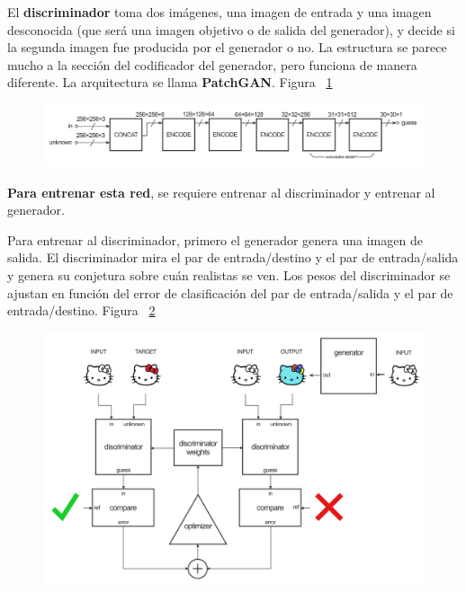 \documentclass[10pt,journal,compsoc]{IEEEtran}\usepackage[T1]{fontenc}                              %
\begin{document}
El \textbf{discriminador} toma dos imágenes, una imagen de entrada y una
imagen desconocida (que será una imagen objetivo o de salida del
generador), y decide si la segunda imagen fue producida por el generador
o no. La estructura se parece mucho a la sección del codificador del
generador, pero funciona de manera diferente. La arquitectura se llama
\textbf{PatchGAN}. Figura ~\ref{fig:7}

\begin{figure}[!htb]
  \begin{center}
    \includegraphics[width=\linewidth]{./imgs/08_pix2pix_example.png}
    \caption{}
    \label{fig:7}
  \end{center}
\end{figure}

\textbf{Para entrenar esta red}, se requiere entrenar al discriminador y
entrenar al generador.

Para entrenar al discriminador, primero el generador genera una imagen
de salida. El discriminador mira el par de entrada/destino y el par de
entrada/salida y genera su conjetura sobre cuán realistas se ven. Los
pesos del discriminador se ajustan en función del error de clasificación
del par de entrada/salida y el par de entrada/destino. Figura ~\ref{fig:8}

\begin{figure}[!htb]
  \begin{center}
    \includegraphics[width=\linewidth]{./imgs/09_pix2pix_example.png}
    \caption{}
    \label{fig:8}
  \end{center}
\end{figure}
\end{document}
